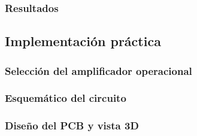 \subsubsection{Resultados}

\subsection{Implementaci\'on pr\'actica}
\subsubsection{Selecci\'on del amplificador operacional}
\subsubsection{Esquem\'atico del circuito}
\subsubsection{Dise\~no del PCB y vista 3D}
